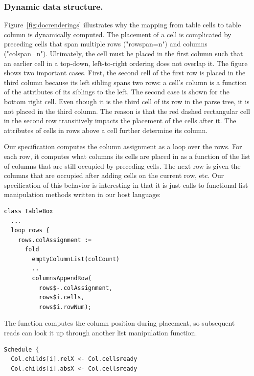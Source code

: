\subsubsection{Dynamic data structure.}
Figure~\ref{fig:docrenderings} illustrates why the mapping from table cells to table column is dynamically computed. The placement of a cell is complicated by preceding cells that span multiple rows ("rowspan=n") and columns ("colspan=n"). Ultimately, the cell must be placed in the first column such that an earlier cell in a top-down, left-to-right ordering does not overlap it. The figure shows two important cases. First, the second cell of the first row is placed in the third column because its left sibling spans two rows: a cell's column is a function of the  attributes of its siblings to the left.  The second case is shown for the bottom right cell. Even though it is the third cell of its row in the parse tree, it is not placed in the third column. The reason is that the red dashed rectangular cell in the second row transitively impacts the placement of the cells after it. The  attributes of cells in rows above a cell further determine its column.

Our specification computes the column assignment as a loop over the rows. For each row, it computes what columns its cells are placed in as a function of the list of columns that are still occupied by preceding cells. The next row is given the columns that are occupied after adding cells on the current row, etc. Our specification of this behavior is interesting in that it is just calls to functional list manipulation methods written in our host language:
\begin{lstlisting}
class TableBox
  ...
  loop rows {
    rows.colAssignment := 
      fold 
        emptyColumnList(colCount) 
        .. 
        columnsAppendRow(
          rows$-.colAssignment, 
          rows$i.cells, 
          rows$i.rowNum);
\end{lstlisting}
The  function computes the column position during placement, so subsequent reads can look it up through another list manipulation function.





\newsavebox{\tabledyna}
\begin{lrbox}{\tabledyna}%
\centering
\begin{lstlisting}[language=C++,morekeywords={spawn,join,reverse,parallel_for},xleftmargin=10.0ex]
Schedule {
  Col.childs[i].relX <- Col.cellsready
  Col.childs[i].absX <- Col.cellsready
\end{lstlisting}
\end{lrbox}

